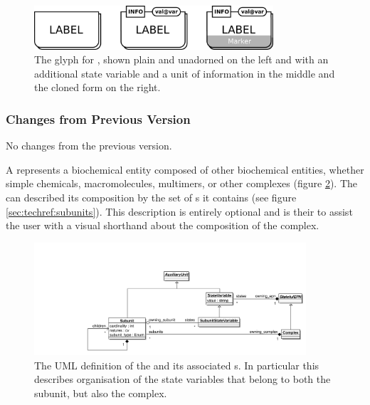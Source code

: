 \begin{figure}[htb]
  \centering
  \includegraphics[width = 3.5in]{images/geneticMultimer}
  \caption{The \PD glyph for , shown plain and
    unadorned on the left and with an additional state variable and a
    unit of information in the middle and the cloned form on the right.}
  \label{fig:techref:genetic-multimer}
\end{figure}

\subsubsection{Changes from Previous Version}

No changes from the previous version.


\label{sec:techref:complex}
\label{defn:Complex}

A  represents a biochemical entity composed of
other biochemical entities, whether simple chemicals, macromolecules, multimers, or other complexes (figure
\ref{fig:techref:complexsubunituml}). The  can described
its composition by the set of s it contains (see
figure \ref{sec:techref:subunits}). This description is entirely optional and
is their to assist the user with a visual shorthand about the
composition of the complex.

\begin{figure}[htb]
  \centering
  \includegraphics[width = 0.9\textwidth]{images/complexsubunituml}
  \caption{The UML definition of the  and its
    associated s. In particular this describes organisation
   of the state variables that belong to both the subunit, but also
   the complex.}
  \label{fig:techref:complexsubunituml}
\end{figure}

